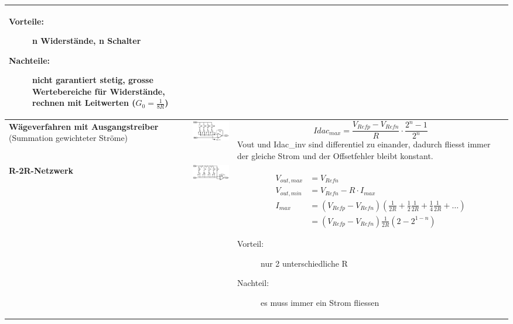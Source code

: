\begin{longtable}{|p{3cm}|c|p{8.6cm}|}
	  \begin{description}
  		\item[Vorteile:] n Widerstände, n Schalter
  		\item[Nachteile:] nicht garantiert stetig, grosse Wertebereiche für Widerstände, rechnen mit Leitwerten ($G_0 = \frac{1}{8R}$)
	  \end{description}
	\\ \hline
	\textbf{Wägeverfahren mit Ausgangstreiber} \newline
  (Summation gewichteter Ströme)
	& \includegraphics[width=6cm, valign=t]{./pictures/praktisch.png}
	& \[ Idac_{max}=\frac{V_{Refp}-V_{Refn}}{R} \cdot \frac{2^n-1}{2^n} \] \newline
    Vout und Idac\_inv sind differentiel zu einander, dadurch fliesst immer der gleiche Strom
    und der Offsetfehler bleibt konstant.
	\\ \hline
	\textbf{R-2R-Netzwerk \hartl{462}}
	& \includegraphics[width=6cm, valign=t]{./pictures/r2rnetzwerk.png}
	& {
	\begin{align*}
		V_{out,max} &= V_{Refn} \\
		V_{out,min} &= V_{Refn} - R \cdot I_{max}\\
		I_{max}		&= (V_{Refp} - V_{Refn}) (\frac{1}{2R} + \frac{1}{2}\frac{1}{2R} + \frac{1}{4} \frac{1}{2R} + \ldots) \\
					&= (V_{Refp} - V_{Refn})\frac{1}{2R}(2-2^{1-n})
	\end{align*}}
  
  \begin{description}
    \item[Vorteil:] nur 2 unterschiedliche R
    \item[Nachteil:] es muss immer ein Strom fliessen
  \end{description}
  

\end{longtable}
